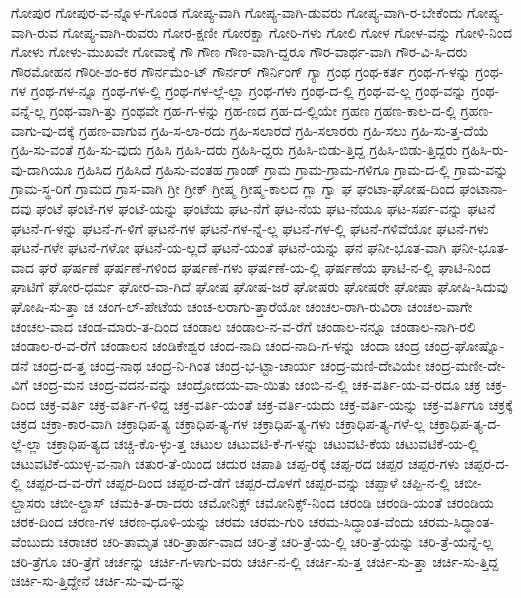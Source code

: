 {ಗೋಪುರ
ಗೋಪುರ-ವ-ನ್ನೊಳ-ಗೊಂಡ
ಗೋಪ್ಯ-ವಾಗಿ
ಗೋಪ್ಯ-ವಾಗಿ-ಡುವರು
ಗೋಪ್ಯ-ವಾಗಿ-ರ-ಬೇಕೆಂದು
ಗೋಪ್ಯ-ವಾಗಿ-ರುವ
ಗೋಪ್ಯ-ವಾಗಿ-ರುವರು
ಗೋರ-ಕ್ಷಣೀ
ಗೋರಕ್ಷಾ
ಗೋರಿ-ಗಳು
ಗೋಲಿ
ಗೋಳ
ಗೋಳ-ವನ್ನು
ಗೋಳಿ-ನಿಂದ
ಗೋಳು
ಗೋಳು-ಮುಖವೇ
ಗೋವಾಕ್ಕೆ
ಗೌ
ಗೌಣ
ಗೌಣ-ವಾಗಿ-ದ್ದರೂ
ಗೌರ-ವಾರ್ಥ-ವಾಗಿ
ಗೌರ-ವಿ-ಸಿ-ದರು
ಗೌರಮೋಹನ
ಗೌರೀ-ಶಂ-ಕರ
ಗೌರ್ನಮೆಂ-ಟ್
ಗೌರ್ನರ್
ಗೌರ್ನಿಂಗ್
ಗ್ಯಾ
ಗ್ರಂಥ
ಗ್ರಂಥ-ಕರ್ತ
ಗ್ರಂಥ-ಗ-ಳನ್ನು
ಗ್ರಂಥ-ಗಳ
ಗ್ರಂಥ-ಗಳ-ನ್ನೂ
ಗ್ರಂಥ-ಗಳ-ಲ್ಲಿ
ಗ್ರಂಥ-ಗಳ-ಲ್ಲೆ-ಲ್ಲಾ
ಗ್ರಂಥ-ಗಳು
ಗ್ರಂಥ-ದ-ಲ್ಲಿ
ಗ್ರಂಥ-ವ-ಲ್ಲ
ಗ್ರಂಥ-ವನ್ನು
ಗ್ರಂಥ-ವನ್ನೆ-ಲ್ಲ
ಗ್ರಂಥ-ವಾಗಿ-ತ್ತು
ಗ್ರಂಥವೇ
ಗ್ರಹ-ಗ-ಳನ್ನು
ಗ್ರಹ-ಣದ
ಗ್ರಹ-ದ-ಲ್ಲಿಯೇ
ಗ್ರಹಣ
ಗ್ರಹಣ-ಕಾಲ-ದ-ಲ್ಲಿ
ಗ್ರಹಣ-ವಾಗು-ವು-ದಕ್ಕೆ
ಗ್ರಹಣ-ವಾಗುವ
ಗ್ರಹಿ-ಸ-ಲಾ-ರದು
ಗ್ರಹಿ-ಸಲಾರದೆ
ಗ್ರಹಿ-ಸಲಾರರು
ಗ್ರಹಿ-ಸಲು
ಗ್ರಹಿ-ಸು-ತ್ತ-ದೆಯೆ
ಗ್ರಹಿ-ಸು-ವಂತೆ
ಗ್ರಹಿ-ಸು-ವುದು
ಗ್ರಹಿಸಿ
ಗ್ರಹಿಸಿ-ದರು
ಗ್ರಹಿಸಿ-ದ್ದರು
ಗ್ರಹಿಸಿ-ಬಿಡು-ತ್ತಿದ್ದ
ಗ್ರಹಿಸಿ-ಬಿಡು-ತ್ತಿದ್ದರು
ಗ್ರಹಿಸಿ-ರು-ವು-ದಾಗಿಯೂ
ಗ್ರಹಿಸಿದ
ಗ್ರಹಿಸಿದೆ
ಗ್ರಹಿಸು-ವಂತಹ
ಗ್ರಾಂಡ್
ಗ್ರಾಮ
ಗ್ರಾಮ-ಗ್ರಾಮ-ಗಳಿಗೂ
ಗ್ರಾಮ-ದ-ಲ್ಲಿ
ಗ್ರಾಮ-ವನ್ನು
ಗ್ರಾಮ-ಸ್ಥ-ರಿಗೆ
ಗ್ರಾಮದ
ಗ್ರಾಸ-ವಾಗಿ
ಗ್ರೀ
ಗ್ರೀಕ್
ಗ್ರೀಷ್ಮ
ಗ್ರೀಷ್ಮ-ಕಾಲದ
ಗ್ಲಾ
ಗ್ವಾ
ಘ
ಘಂಟಾ-ಘೋಷ-ದಿಂದ
ಘಂಟಾನಾ-ದವು
ಘಂಟೆ
ಘಂಟೆ-ಗಳ
ಘಂಟೆ-ಯನ್ನು
ಘಂಟೆಯ
ಘಟ-ನೆಗೆ
ಘಟ-ನೆಯ
ಘಟ-ನೆಯೂ
ಘಟ-ಸರ್ಪ-ವನ್ನು
ಘಟನೆ
ಘಟನೆ-ಗ-ಳನ್ನು
ಘಟನೆ-ಗ-ಳಿಗೆ
ಘಟನೆ-ಗಳ
ಘಟನೆ-ಗಳ-ನ್ನೆ-ಲ್ಲ
ಘಟನೆ-ಗಳ-ಲ್ಲಿ
ಘಟನೆ-ಗಳಿವೆಯೋ
ಘಟನೆ-ಗಳು
ಘಟನೆ-ಗಳೇ
ಘಟನೆ-ಗಳೋ
ಘಟನೆ-ಯ-ಲ್ಲದೆ
ಘಟನೆ-ಯಂತೆ
ಘಟನೆ-ಯನ್ನು
ಘನ
ಘನೀ-ಭೂತ-ವಾಗಿ
ಘನೀ-ಭೂತ-ವಾದ
ಘರೆ
ಘರ್ಷಣೆ
ಘರ್ಷಣೆ-ಗಳಿಂದ
ಘರ್ಷಣೆ-ಗಳು
ಘರ್ಷಣೆ-ಯ-ಲ್ಲಿ
ಘರ್ಷಣೆಯ
ಘಾಟಿ-ನ-ಲ್ಲಿ
ಘಾಟಿ-ನಿಂದ
ಘಾಟಿಗೆ
ಘೋರ-ಧರ್ಮ
ಘೋರ-ವಾ-ಗಿದೆ
ಘೋಷ
ಘೋಷ-ಜರೆ
ಘೋಷರು
ಘೋಷರೇ
ಘೋಷಾ
ಘೋಷಿ-ಸಿದುವು
ಘೋಷಿ-ಸು-ತ್ತಾ
ಚ
ಚಂಗ-ಲ್-ಪೇಟೆಯ
ಚಂಚ-ಲರಾಗು-ತ್ತಾರೆಯೋ
ಚಂಚಲ-ರಾಗಿ-ರುವಿರಾ
ಚಂಚಲ-ವಾಗೇ
ಚಂಚಲ-ವಾದ
ಚಂಡ-ಮಾರು-ತ-ದಿಂದ
ಚಂಡಾಲ
ಚಂಡಾಲ-ನ-ವ-ರೆಗೆ
ಚಂಡಾಲ-ನನ್ನೂ
ಚಂಡಾಲ-ನಾಗಿ-ರಲಿ
ಚಂಡಾಲ-ರ-ವ-ರೆಗೆ
ಚಂಡಾಲನ
ಚಂಡಿಕೇಶ್ವರ
ಚಂದ-ನಾದಿ
ಚಂದ-ನಾದಿ-ಗ-ಳನ್ನು
ಚಂದಾ
ಚಂದ್ರ
ಚಂದ್ರ-ಘೋಷ್ನೊ-ಡನೆ
ಚಂದ್ರ-ದ-ತ್ತ
ಚಂದ್ರ-ನಾಥ
ಚಂದ್ರ-ನಿ-ಗಿಂತ
ಚಂದ್ರ-ಭ-ಟ್ಟಾ-ಚಾರ್ಯ
ಚಂದ್ರ-ಮಣಿ-ದೇವಿಯೇ
ಚಂದ್ರ-ಮಣೀ-ದೇ-ವಿಗೆ
ಚಂದ್ರ-ಮನ
ಚಂದ್ರ-ವದನ-ವನ್ನು
ಚಂದ್ರೋದಯ-ವಾ-ಯಿತು
ಚಂಬಿ-ನ-ಲ್ಲಿ
ಚಕ-ವರ್ತಿ-ಯ-ವ-ರದೂ
ಚಕ್ರ
ಚಕ್ರ-ದಿಂದ
ಚಕ್ರ-ವರ್ತಿ
ಚಕ್ರ-ವರ್ತಿ-ಗ-ಳಿದ್ದ
ಚಕ್ರ-ವರ್ತಿ-ಯಂತೆ
ಚಕ್ರ-ವರ್ತಿ-ಯದು
ಚಕ್ರ-ವರ್ತಿ-ಯನ್ನು
ಚಕ್ರ-ವರ್ತಿಗೂ
ಚಕ್ರಕ್ಕೆ
ಚಕ್ರದ
ಚಕ್ರಾ-ಕಾರ-ವಾಗಿ
ಚಕ್ರಾಧಿಪ-ತ್ಯ
ಚಕ್ರಾಧಿಪ-ತ್ಯ-ಗಳ
ಚಕ್ರಾಧಿಪ-ತ್ಯ-ಗಳು
ಚಕ್ರಾಧಿಪ-ತ್ಯ-ಗಳೆ-ಲ್ಲ
ಚಕ್ರಾಧಿಪ-ತ್ಯ-ದ-ಲ್ಲೆ-ಲ್ಲಾ
ಚಕ್ರಾಧಿಪ-ತ್ಯದ
ಚಚ್ಚಿ-ಕೊ-ಳ್ಳು-ತ್ತ
ಚಟುಲ
ಚಟುವಟಿ-ಕೆ-ಗ-ಳನ್ನು
ಚಟುವಟಿ-ಕೆಯ
ಚಟುವಟಿಕೆ-ಯ-ಲ್ಲಿ
ಚಟುವಟಿಕೆ-ಯುಳ್ಳ-ವ-ನಾಗಿ
ಚತುರ-ತೆ-ಯಿಂದ
ಚದುರ
ಚಪಾತಿ
ಚಪ್ಪ-ರಕ್ಕೆ
ಚಪ್ಪ-ರದ
ಚಪ್ಪರ
ಚಪ್ಪರ-ಗಳು
ಚಪ್ಪರ-ದ-ಲ್ಲಿ
ಚಪ್ಪರ-ದ-ವ-ರೆಗೆ
ಚಪ್ಪರ-ದಿಂದ
ಚಪ್ಪರ-ದೆ-ಡೆಗೆ
ಚಪ್ಪರ-ದೊಳಗೆ
ಚಪ್ಪರ-ವನ್ನು
ಚಪ್ಪಾಳೆ
ಚಪ್ಪಿ-ನ-ಲ್ಲಿ
ಚಬೀ-ಲ್ದಾಸರು
ಚಬೀ-ಲ್ದಾಸ್
ಚಮಕಿ-ತ-ರಾ-ದರು
ಚಮೋನಿಕ್ಸ್
ಚಮೋನಿಕ್ಸ್-ನಿಂದ
ಚರಂಡಿ
ಚರಂಡಿ-ಯಂತೆ
ಚರಂಡಿಯ
ಚರಕ-ದಿಂದ
ಚರಣ-ಗಳ
ಚರಣ-ಧೂಳಿ-ಯನ್ನು
ಚರಮ
ಚರಮ-ಗುರಿ
ಚರಮ-ಸಿದ್ಧಾಂತ-ವೆಂದು
ಚರಮ-ಸಿದ್ಧಾಂತ-ವೆಂಬುದು
ಚರಾಚರ
ಚರಿ-ತಾಮೃತ
ಚರಿ-ತ್ರಾರ್ಹ-ವಾದ
ಚರಿ-ತ್ರೆ
ಚರಿ-ತ್ರೆ-ಯ-ಲ್ಲಿ
ಚರಿ-ತ್ರೆ-ಯನ್ನು
ಚರಿ-ತ್ರೆ-ಯನ್ನೆ-ಲ್ಲ
ಚರಿ-ತ್ರೆಗೂ
ಚರಿ-ತ್ರೆಗೆ
ಚರ್ಚನ್ನು
ಚರ್ಚಿ-ಗ-ಳಾಗು-ವರು
ಚರ್ಚಿ-ನ-ಲ್ಲಿ
ಚರ್ಚಿ-ಸು-ತ್ತ
ಚರ್ಚಿ-ಸು-ತ್ತಾ
ಚರ್ಚಿ-ಸು-ತ್ತಿದ್ದ
ಚರ್ಚಿ-ಸು-ತ್ತಿದ್ದೇನೆ
ಚರ್ಚಿ-ಸು-ವು-ದ-ನ್ನು
}
